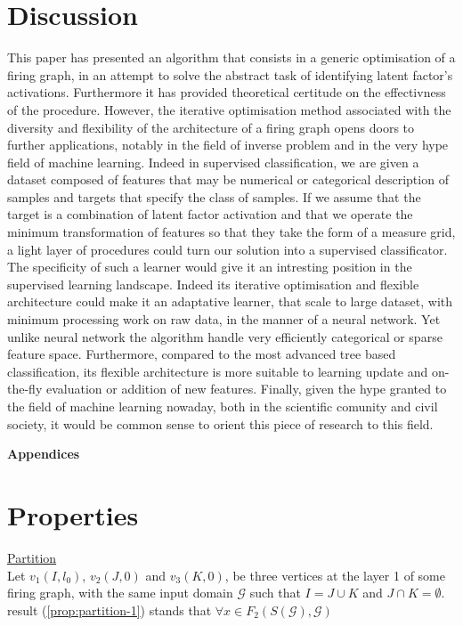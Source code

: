 \documentclass[a4paper, 11pt]{article}
\begin{document}
\section{Discussion}

This paper has presented an algorithm that consists in a generic optimisation of a firing graph, in an attempt to solve the abstract task of identifying latent factor's activations. Furthermore it has provided theoretical certitude on the effectivness of the procedure. However, the iterative optimisation method associated with the diversity and flexibility of the architecture of a firing graph opens doors to further applications, notably in the field of inverse problem and in the very hype field of machine learning. Indeed in supervised classification, we are given a dataset composed of features that may be numerical or categorical description of samples and targets that specify the class of samples. If we assume that the target is a combination of latent factor activation and that we operate the minimum transformation of features so that they take the form of a measure grid, a light layer of procedures could turn our solution into a supervised classificator. The specificity of such a learner would give it an intresting position in the supervised learning landscape. Indeed its iterative optimisation and flexible architecture could make it an adaptative learner, that scale to large dataset, with minimum processing work on raw data, in the manner of a neural network. Yet unlike neural network the algorithm handle very efficiently categorical or sparse feature space. Furthermore, compared to the most advanced tree based classification, its flexible architecture is more suitable to learning update and on-the-fly evaluation or addition of new features. Finally, given the hype granted to the field of machine learning nowaday, both in the scientific comunity and civil society, it would be common sense to orient this piece of research to this field.     


\newpage
\begin{center}
\LARGE \textbf{Appendices}
\end{center}
\appendix

\section{Properties}

\underline{Partition}\\

Let $v_1(I, l_0)$, $v_2(J, 0)$ and $v_3(K, 0)$, be three vertices at the layer 1 of some firing graph, with the same input domain $\mathcal{G}$ such that $I = J \cup K$ and $J \cap K = \emptyset$. result (\ref{prop:partition-1}) stands that $\forall x \in F_2(S(\mathcal{G}), \mathcal{G})$
\end{document}
